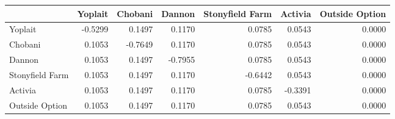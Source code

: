 \begin{tabular}{lrrrrrr}
\toprule
 & Yoplait & Chobani & Dannon & Stonyfield Farm & Activia & Outside Option \\
\midrule
Yoplait & -0.5299 & 0.1497 & 0.1170 & 0.0785 & 0.0543 & 0.0000 \\
Chobani & 0.1053 & -0.7649 & 0.1170 & 0.0785 & 0.0543 & 0.0000 \\
Dannon & 0.1053 & 0.1497 & -0.7955 & 0.0785 & 0.0543 & 0.0000 \\
Stonyfield Farm & 0.1053 & 0.1497 & 0.1170 & -0.6442 & 0.0543 & 0.0000 \\
Activia & 0.1053 & 0.1497 & 0.1170 & 0.0785 & -0.3391 & 0.0000 \\
Outside Option & 0.1053 & 0.1497 & 0.1170 & 0.0785 & 0.0543 & 0.0000 \\
\bottomrule
\end{tabular}
